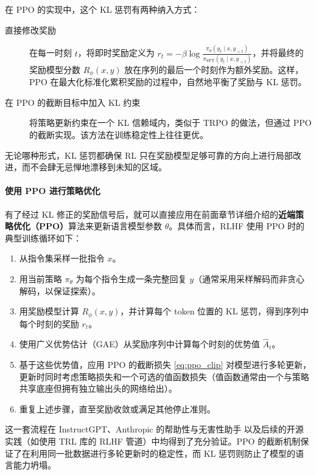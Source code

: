 在 PPO 的实现中，这个 KL 惩罚有两种纳入方式：
\begin{description}
    \item[直接修改奖励] 在每一时刻 $t$，将即时奖励定义为 $r_t = -\beta \log \frac{\pi_\theta(y_t \mid x, y_{<t})}{\pi_{\text{SFT}}(y_t \mid x, y_{<t})}$，并将最终的奖励模型分数 $R_\phi(x, y)$ 放在序列的最后一个时刻作为额外奖励。这样，PPO 在最大化标准化累积奖励的过程中，自然地平衡了奖励与 KL 惩罚。
    \item[在 PPO 的截断目标中加入 KL 约束] 将策略更新约束在一个 KL 信赖域内，类似于 TRPO 的做法，但通过 PPO 的截断实现。该方法在训练稳定性上往往更优\cite{ouyang2022traininglanguagemodelsfollow}。
\end{description}
无论哪种形式，KL 惩罚都确保 RL 只在奖励模型足够可靠的方向上进行局部改进，而不会肆无忌惮地漂移到未知的区域。

\paragraph{使用 PPO 进行策略优化}

有了经过 KL 修正的奖励信号后，就可以直接应用在前面章节详细介绍的\textbf{近端策略优化（PPO）}算法来更新语言模型参数 $\theta$。具体而言，RLHF 使用 PPO 时的典型训练循环如下：
\begin{enumerate}
    \item 从指令集采样一批指令 $x$。
    \item 用当前策略 $\pi_\theta$ 为每个指令生成一条完整回复 $y$（通常采用采样解码而非贪心解码，以保证探索）。
    \item 用奖励模型计算 $R_\phi(x, y)$，并计算每个 token 位置的 KL 惩罚，得到序列中每个时刻的奖励 $r_t$。
    \item 使用广义优势估计（GAE）从奖励序列中计算每个时刻的优势值 $\hat{A}_t$。
    \item 基于这些优势值，应用 PPO 的截断损失 \eqref{eq:ppo_clip} 对模型进行多轮更新，更新时同时考虑策略损失和一个可选的值函数损失（值函数通常由一个与策略共享底座但拥有独立输出头的网络给出）。
    \item 重复上述步骤，直至奖励收敛或满足其他停止准则。
\end{enumerate}

这一套流程在 InstructGPT\cite{ouyang2022traininglanguagemodelsfollow}、Anthropic 的帮助性与无害性助手\cite{bai2022traininghelpfulharmlessassistant} 以及后续的开源实践（如使用 TRL 库的 RLHF 管道）中均得到了充分验证。PPO 的截断机制保证了在利用同一批数据进行多轮更新时的稳定性，而 KL 惩罚则防止了模型的语言能力坍塌。

